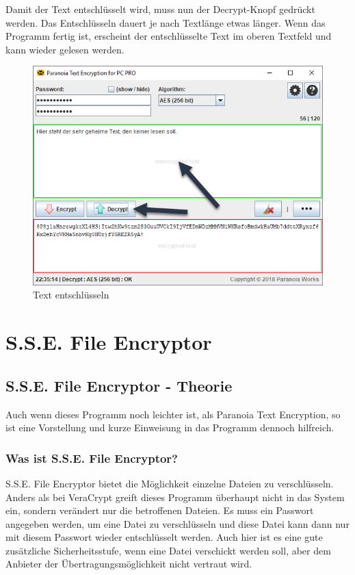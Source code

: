 \documentclass[12pt,a4paper]{scrreprt}
\begin{document}
\newpage

\noindent Damit der Text entschlüsselt wird, muss nun der Decrypt-Knopf gedrückt werden. Das Entschlüsseln dauert je nach Textlänge etwas länger. Wenn das Programm fertig ist, erscheint der entschlüsselte Text im oberen Textfeld und kann wieder gelesen werden.

\begin{figure}[h]
\begin{center}
\includegraphics[width=350pt]{media/pte5.png}
\caption{Text entschlüsseln}
\label{pte6}
\end{center}
\end{figure}


\part{S.S.E. File Encryptor}

\chapter{S.S.E. File Encryptor - Theorie}
Auch wenn dieses Programm noch leichter ist, als Paranoia Text Encryption, so ist eine Vorstellung und kurze Einweisung in das Programm dennoch hilfreich.

\section{Was ist S.S.E. File Encryptor?}
S.S.E. File Encryptor bietet die Möglichkeit einzelne Dateien zu verschlüsseln. Anders als bei VeraCrypt greift dieses Programm überhaupt nicht in das System ein, sondern verändert nur die betroffenen Dateien. Es muss ein Passwort angegeben werden, um eine Datei zu verschlüsseln und diese Datei kann dann nur mit diesem Passwort wieder entschlüsselt werden. Auch hier ist es eine gute zusätzliche Sicherheitsstufe, wenn eine Datei verschickt werden soll, aber dem Anbieter der Übertragungsmöglichkeit nicht vertraut wird.
\end{document}
